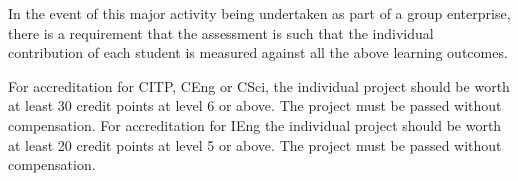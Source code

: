 \documentclass{../fal_assignment}
\begin{document}
In the event of this major activity being undertaken as part of a group enterprise, there is a requirement that the
assessment is such that the individual contribution of each student is measured against all the above learning
outcomes.

For accreditation for CITP, CEng or CSci, the individual project should be worth at least 30 credit points at level 6 or
above. The project must be passed without compensation.
For accreditation for IEng the individual project should be worth at least 20 credit points at level 5 or above. The project
must be passed without compensation. 
\end{document}
